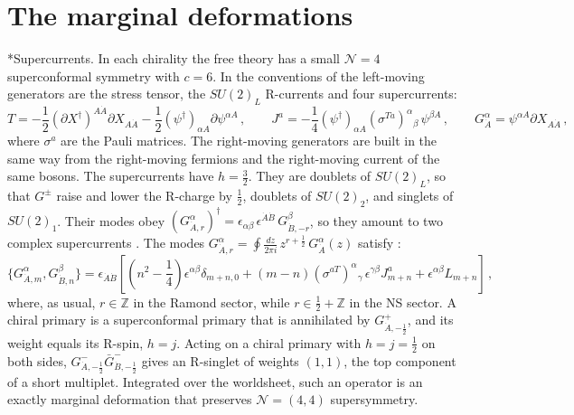 \documentclass[aps,onecolumn,groupedaddress,nofootinbib,pra]{revtex4-2}
\makeatletter
\renewcommand\paragraph{\@startsection{paragraph}{4}{\parindent}{\z@}{-1em}{\normalfont\normalsize\bfseries}}
\makeatother
\begin{document}
\section{The marginal deformations}
\label{app:deformations}

\paragraph*{Supercurrents.}
In each chirality the free theory has a small $\mathcal N=4$ superconformal symmetry with $c=6$. In the conventions of \cite{Avery:2010er} the left-moving generators are the stress tensor, the $SU(2)_L$ R-currents and four supercurrents:
\begin{equation}
\label{eq:N4gen}
T=-\frac12(\partial X^\dagger)^{A\dot A}\partial X_{A\dot A}-\frac12(\psi^\dagger)_{\alpha A}\partial\psi^{\alpha A}\,,\qquad
J^a=-\frac14(\psi^\dagger)_{\alpha A}(\sigma^{Ta})^{\alpha}{}_{\beta}\,\psi^{\beta A}\,,\qquad
G^\alpha_{\dot A}=\psi^{\alpha A}\partial X_{A\dot A}\,,
\end{equation}
where $\sigma^a$ are the Pauli matrices. The right-moving generators are built in the same way from the right-moving fermions and the right-moving current of the same bosons. The supercurrents have $h=\frac32$. They are doublets of $SU(2)_L$, so that $G^{\pm}$ raise and lower the R-charge by $\frac12$, doublets of $SU(2)_2$, and singlets of $SU(2)_1$. Their modes obey $(G^\alpha_{\dot A,r})^\dagger=\epsilon_{\alpha\beta}\,\epsilon^{\dot A\dot B}\,G^{\beta}_{\dot B,-r}$, so they amount to two complex supercurrents \cite{Guo:2019ady}. The modes $G^\alpha_{\dot A,r}=\oint\frac{dz}{2\pi i }\,z^{r+\frac12}\,G^\alpha_{\dot A}(z)$ satisfy \cite{Avery:2010er}:
\begin{equation}
\label{eq:GG}
\{G^\alpha_{\dot A,m},G^\beta_{\dot B,n}\}=\epsilon_{\dot A\dot B}\left[\left(n^2-\frac14\right)\epsilon^{\alpha\beta}\delta_{m+n,0}
+(m-n)(\sigma^{aT})^{\alpha}{}_{\gamma}\,\epsilon^{\gamma\beta}J^a_{m+n}+\epsilon^{\alpha\beta}L_{m+n}\right]\,,
\end{equation}
where, as usual, $r\in \mathbb{Z}$ in the Ramond sector, while $r\in \frac12+\mathbb{Z}$ in the NS sector. A chiral primary is a superconformal primary that is annihilated by $G^{+}_{\dot A,-\frac12}$, and its weight equals its R-spin, $h=j$. Acting on a chiral primary with $h=j=\frac12$ on both sides, $G^{-}_{\dot A,-\frac12}\bar G^{-}_{\dot B,-\frac12}$ gives an R-singlet of weights $(1,1)$, the top component of a short multiplet. Integrated over the worldsheet, such an operator is an exactly marginal deformation that preserves $\mathcal N=(4,4)$ supersymmetry.\\
\end{document}
